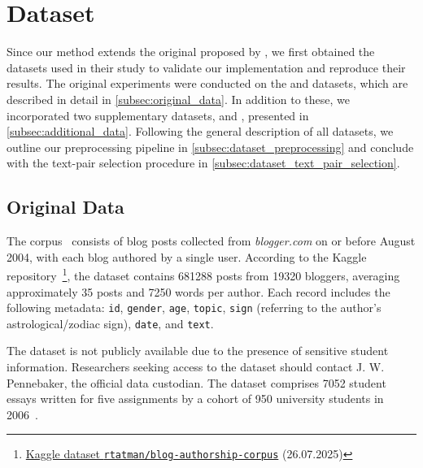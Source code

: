 \section{Dataset}
\label{sec:dataset}

Since our method extends the original \impAppr{} proposed by \citet{koppel_determining_2014}, we first obtained the datasets used in their study to validate our implementation and reproduce their results. 
The original experiments were conducted on the \dataBlog{} and \dataStudent{} datasets, which are described in detail in \autoref{subsec:original_data}. 
In addition to these, we incorporated two supplementary datasets, \dataPan{} and \dataGutenberg{}, presented in \autoref{subsec:additional_data}. 
Following the general description of all datasets, we outline our preprocessing pipeline in \autoref{subsec:dataset_preprocessing} and conclude with the text-pair selection procedure in \autoref{subsec:dataset_text_pair_selection}.


\subsection{Original Data}
\label{subsec:original_data}

The \dataBlog{} corpus~\citep{blog_dataset_2006} consists of blog posts collected from \textit{blogger.com} on or before August 2004, with each blog authored by a single user.
According to the Kaggle repository~\footnote{\href{https://www.kaggle.com/datasets/rtatman/blog-authorship-corpus?resource=download}{Kaggle dataset \texttt{rtatman/blog-authorship-corpus}} (26.07.2025)}, the dataset contains \num{681288} posts from \num{19320} bloggers, averaging approximately 35 posts and \num{7250} words per author.
Each record includes the following metadata: \texttt{id}, \texttt{gender}, \texttt{age}, \texttt{topic}, 
\texttt{sign} (referring to the author's astrological/zodiac sign), \texttt{date}, and \texttt{text}.

The \dataStudent{} dataset is not publicly available due to the presence of sensitive student information. 
Researchers seeking access to the \dataStudent{} dataset should contact J. W. Pennebaker, the official data custodian. 
The dataset comprises \num{7052} student essays written for five assignments by a cohort of 950 university students in 2006~\citep{koppel_determining_2014}.

